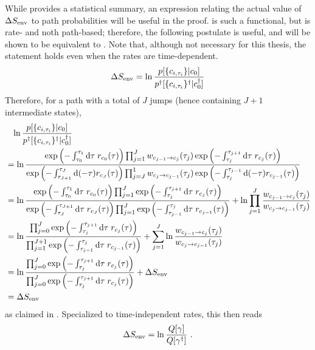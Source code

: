 While  provides a statistical summary, an expression relating the actual value of \(\Delta S_\text{env}\) to path probabilities will be useful in the proof.  is such a functional, but is rate- and noth path-based; therefore, the following postulate is useful, and will be shown to be equivalent to . Note that, although not necessary for this thesis, the statement holds even when the rates are time-dependent.
%
\begin{equation}
	\label{eqn:SEnv path functional}
	\Delta S_\text{env}
	= \ln\frac{p[\{c_{i,\tau_i}\}|c_0]}{p^\dagger[\{c_{i,\tau_i}\}^\dagger|c^\dagger_0]}
\end{equation}
%
Therefore, for a path with a total of \(J\) jumps (hence containing \(J+1\) intermediate states),
%
\begin{align*}
	&\phantom{=}
		\ln\frac{p[\{c_{i,\tau_i}\} | c_0]}{p^\dagger[\{c_{i,\tau_i}\}^\dagger | c_0^\dagger]}
	\\
	&=
		\ln\frac{
			\operatorname{exp}\left(-\int_{\tau_0}^{\tau_1}\mathrm{d}\tau\;r_{c_0}(\tau)\right)
			\prod_{j=1}^J
				w_{c_{j-1} \to c_j}(\tau_j)
				\operatorname{exp}\left(-\int_{\tau_j}^{\tau_{j+1}}\mathrm{d}\tau\;r_{c_j}(\tau)\right)
		}{
			\operatorname{exp}\left(-\int_{\tau_{J+1}}^{\tau_J}\mathrm{d}(-\tau)r_{c_J}(\tau)\right)
			\prod_{j=J}^1
				w_{c_j\to c_{j-1}}(\tau_j)
				\operatorname{exp}\left(-\int_{\tau_j}^{\tau_{j-1}}\mathrm{d}(-\tau)r_{c_{j-1}}(\tau)\right)
		}
	\\
	&=
		\ln\frac{
			\operatorname{exp}\left(-\int_{\tau_0}^{\tau_1}\mathrm{d}\tau\;r_{c_0}(\tau)\right)
			\prod_{j=1}^J
				\operatorname{exp}\left(-\int_{\tau_j}^{\tau_{j+1}}\mathrm{d}\tau\;r_{c_j}(\tau)\right)
		}{
			\operatorname{exp}\left(-\int_{\tau_J}^{\tau_{J+1}}\mathrm{d}\tau\;r_{c_J}(\tau)\right)
			\prod_{j=1}^J
				\operatorname{exp}\left(-\int_{\tau_{j-1}}^{\tau_j}\mathrm{d}\tau\;r_{c_{j-1}}(\tau)\right)
		}
		+ \ln\prod_{j=1}^J\frac{w_{c_{j-1}\to c_j}(\tau_j)}{w_{c_j\to c_{j-1}}(\tau_j)}
	\\
	&=
		\ln\frac{
			\prod_{j=0}^J
				\operatorname{exp}\left(-\int_{\tau_j}^{\tau_{j+1}}\mathrm{d}\tau\;r_{c_j}(\tau)\right)
		}{
			\prod_{j=1}^{J+1}
				\operatorname{exp}\left(-\int_{\tau_{j-1}}^{\tau_j}\mathrm{d}\tau\;r_{c_{j-1}}(\tau)\right)
		}
		+ \sum_{j=1}^J\ln\frac{w_{c_{j-1}\to c_j}(\tau_j)}{w_{c_j\to c_{j-1}}(\tau_j)}
	\\
	&=
		\ln\frac{
			\prod_{j=0}^J
				\operatorname{exp}\left(-\int_{\tau_j}^{\tau_{j+1}}\mathrm{d}\tau\;r_{c_j}(\tau)\right)
		}{
			\prod_{j=0}^J
				\operatorname{exp}\left(-\int_{\tau_j}^{\tau_{j+1}}\mathrm{d}\tau\;r_{c_j}(\tau)\right)
		}
		+ \Delta S_\text{env}
	\\
	&=
		\Delta S_\text{env}
\end{align*}
%
as claimed in . Specialized to time-independent rates, this then reads
\begin{align}
	\label{eqn:SEnv path functional constant rates}
	\Delta S_\text{env}
	= \ln\frac{Q[\gamma]}{Q[\gamma^\dagger]} ~.
\end{align}



